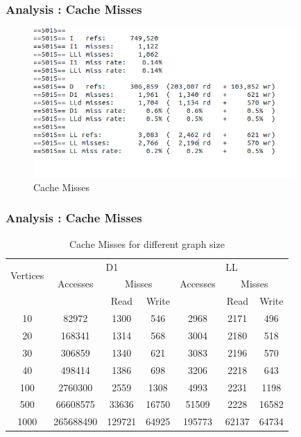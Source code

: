 \documentclass{beamer}
\begin{document}
\begin{frame}
\frametitle{Analysis : Cache Misses}
\begin{figure}
\begin{center}
\includegraphics[width = 10cm]{misses}
\caption{Cache Misses}
\end{center}
\end{figure}
\end{frame}
\begin{frame}
\frametitle{Analysis : Cache Misses}
\begin{table}[h!]
\begin{center}
\begin{tabular}{|c|c|c|c|c|c|c|}

\hline

    \multirow{2}{*}{Vertices} & \multicolumn{3}{c|}{D1} &\multicolumn{3}{c|}{LL} \\
[0.5ex]
    \hhline{~------} 
&	Accesses	&\multicolumn{2}{c|}{Misses}	&Accesses	&\multicolumn{2}{c|}{Misses}\\
\hhline{~~--~--}
& & Read & Write & & Read & Write\\
\hline						
10&	82972&	1300&	546&	2968&	2171&	496\\
\hline
20	&168341	&1314	&568	&3004	&2180	&518\\
\hline
30	&306859	&1340	&621	&3083	&2196	&570\\
\hline
40	&498414	&1386	&698	&3206	&2218	&643\\
\hline
100	&2760300	&2559	&1308	&4993	&2231	&1198\\
\hline
500	&66608575	&33636	&16750	&51509	&2228	&16582\\
\hline
1000	&265688490	&129721	&64925	&195773	&62137	&64734\\
\hline

\end{tabular}
\caption{Cache Misses for different graph size}
\end{center}
\end{table}
\end{frame}
\end{document}
